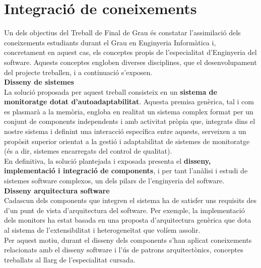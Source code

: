 
\chapter{Integració de coneixements} %

\label{IntegracioConeixements} %

Un dels objectius del Treball de Final de Grau és constatar l'assimilació dels coneixements estudiants durant el Grau en Enginyeria Informàtica i, concretament en aquest cas, els conceptes propis de l'especialitat d'Enginyeria del software. Aquests conceptes engloben diverses disciplines, que el desenvolupament del projecte treballen, i a continuació s'exposen.\\

\textbf{Disseny de sistemes}\\

La solució proposada per aquest treball consisteix en un \textbf{sistema de monitoratge dotat d'autoadaptabilitat}. Aquesta premisa genèrica, tal i com es plasmarà a la memòria, engloba en realitat un sistema complex format per un conjunt de components independents i amb activitat pròpia que, integrats dins el nostre sistema i definint una interacció específica entre aquests, serveixen a un propòsit superior orientat a la gestió i adaptabilitat de sistemes de monitoratge (és a dir, sistemes encarregats del control de qualitat).\\

En definitiva, la solució plantejada i exposada presenta el \textbf{disseny, implementació i integració de components}, i per tant l'anàlisi i estudi de sistemes software complexos, un dels pilars de l'enginyeria del software.\\

\textbf{Disseny arquitectura software}\\

Cadascun dels components que integren el sistema ha de satisfer uns requisits des d'un punt de vista d'arquitectura del software. Per exemple, la implementació dels monitors ha estat basada en una proposta d'arquitectura genèrica que dota al sistema de l'extensibilitat i heterogeneïtat que volíem assolir.\\

Per aquest motiu, durant el disseny dels components s'han aplicat coneixements relacionats amb el disseny software i l'ús de patrons arquitectònics, conceptes treballats al llarg de l'especialitat cursada.\\

